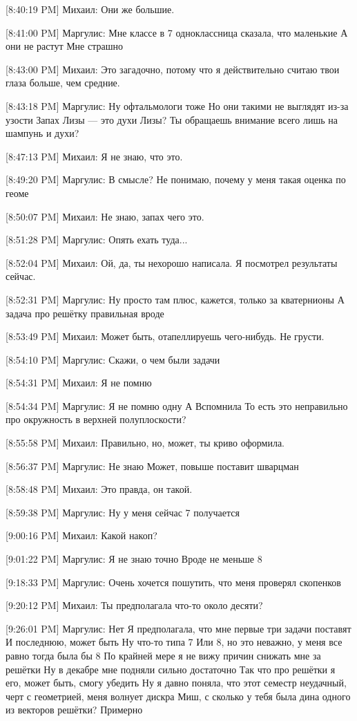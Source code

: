 \documentclass{article}
\begin{document}
[8:40:19 PM] Михаил:
Они же большие.

[8:41:00 PM] Маргулис:
Мне классе в 7 одноклассница сказала, что маленькие
 А они не растут
 Мне страшно

[8:43:00 PM] Михаил:
Это загадочно, потому что я действительно считаю твои глаза больше, чем средние.

[8:43:18 PM] Маргулис:
Ну офтальмологи тоже
 Но они такими не выглядят из-за узости
 Запах Лизы — это духи Лизы?
 Ты обращаешь внимание всего лишь на шампунь и духи?

[8:47:13 PM] Михаил:
Я не знаю, что это.

[8:49:20 PM] Маргулис:
В смысле?
 Не понимаю, почему у меня такая оценка по геоме

[8:50:07 PM] Михаил:
Не знаю, запах чего это.

[8:51:28 PM] Маргулис:
Опять ехать туда...

[8:52:04 PM] Михаил:
Ой, да, ты нехорошо написала. Я посмотрел результаты сейчас.

[8:52:31 PM] Маргулис:
Ну просто там плюс, кажется, только за кватернионы
 А задача про решётку правильная вроде

[8:53:49 PM] Михаил:
Может быть, отапеллируешь чего-нибудь. Не грусти.

[8:54:10 PM] Маргулис:
Скажи, о чем были задачи

[8:54:31 PM] Михаил:
Я не помню

[8:54:34 PM] Маргулис:
Я не помню одну
 А
 Вспомнила
 То есть это неправильно про окружность в верхней полуплоскости?

[8:55:58 PM] Михаил:
Правильно, но, может, ты криво оформила.

[8:56:37 PM] Маргулис:
Не знаю
 Может, повыше поставит шварцман

[8:58:48 PM] Михаил:
Это правда, он такой.

[8:59:38 PM] Маргулис:
Ну у меня сейчас 7 получается

[9:00:16 PM] Михаил:
Какой накоп?

[9:01:22 PM] Маргулис:
Я не знаю точно
 Вроде не меньше 8

[9:18:33 PM] Маргулис:
Очень хочется пошутить, что меня проверял скопенков

[9:20:12 PM] Михаил:
Ты предполагала что-то около десяти?

[9:26:01 PM] Маргулис:
Нет
 Я предполагала, что мне первые три задачи поставят
 И последнюю, может быть
 Ну что-то типа 7
 Или 8, но это неважно, у меня все равно тогда была бы 8
 По крайней мере я не вижу причин снижать мне за решётки
 Ну в декабре мне подняли сильно достаточно
 Так что про решётки я его, может быть, смогу убедить
 Ну я давно поняла, что этот семестр неудачный, черт с геометрией, меня волнует дискра
 Миш, с сколько у тебя была дина одного из векторов решётки?
 Примерно
\end{document}
